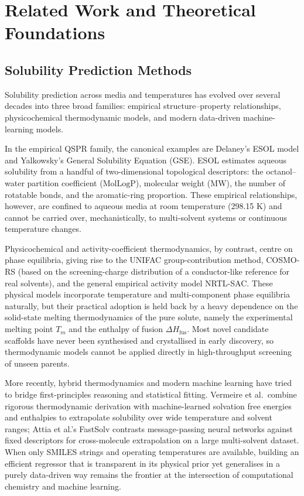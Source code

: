 \section{Related Work and Theoretical Foundations}

\subsection{Solubility Prediction Methods}

Solubility prediction across media and temperatures has evolved over several decades into three broad families: empirical structure--property relationships, physicochemical thermodynamic models, and modern data-driven machine-learning models.

In the empirical QSPR family, the canonical examples are Delaney's ESOL model\cite{delaney2004} and Yalkowsky's General Solubility Equation (GSE). ESOL estimates aqueous solubility from a handful of two-dimensional topological descriptors: the octanol--water partition coefficient ($\mathrm{MolLogP}$), molecular weight ($\mathrm{MW}$), the number of rotatable bonds, and the aromatic-ring proportion. These empirical relationships, however, are confined to aqueous media at room temperature (298.15 K) and cannot be carried over, mechanistically, to multi-solvent systems or continuous temperature changes.

Physicochemical and activity-coefficient thermodynamics, by contrast, centre on phase equilibria, giving rise to the UNIFAC group-contribution method, COSMO-RS (based on the screening-charge distribution of a conductor-like reference for real solvents), and the general empirical activity model NRTL-SAC. These physical models incorporate temperature and multi-component phase equilibria naturally, but their practical adoption is held back by a heavy dependence on the solid-state melting thermodynamics of the pure solute, namely the experimental melting point $T_m$ and the enthalpy of fusion $\Delta H_{\mathrm{fus}}$. Most novel candidate scaffolds have never been synthesised and crystallised in early discovery, so thermodynamic models cannot be applied directly in high-throughput screening of unseen parents.

More recently, hybrid thermodynamics and modern machine learning have tried to bridge first-principles reasoning and statistical fitting. Vermeire et al.\ combine rigorous thermodynamic derivation with machine-learned solvation free energies and enthalpies to extrapolate solubility over wide temperature and solvent ranges\cite{vermeire2022}; Attia et al.'s FastSolv contrasts message-passing neural networks against fixed descriptors for cross-molecule extrapolation on a large multi-solvent dataset\cite{fastsolv2025}. When only SMILES strings and operating temperatures are available, building an efficient regressor that is transparent in its physical prior yet generalises in a purely data-driven way remains the frontier at the intersection of computational chemistry and machine learning.

